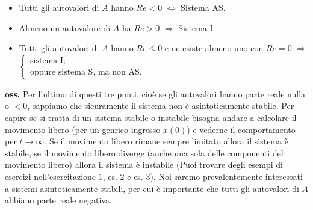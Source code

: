 \begin{itemize}
    \item Tutti gli autovalori di $A$ hanno $Re <0$ $\Longleftrightarrow$ Sistema AS.
    \item Almeno un autovalore di $A$ ha $Re > 0$ $\Longrightarrow$ Sistema I.
    \item Tutti gli autovalori di $A$ hanno $Re \leq 0$ e ne esiste almeno uno con $Re = 0$ $\Longrightarrow$ $\begin{cases}
        \text{sistema I;}\;\\
        \text{oppure sistema S, ma non AS.}\;
    \end{cases}$
\end{itemize}
\textbf{oss.} Per l'ultimo di questi tre punti, cioè se gli autovalori hanno parte reale nulla o $< 0$, sappiamo che sicuramente il sistema non è asintoticamente stabile. Per capire se si tratta di un sistema stabile o instabile bisogna andare a calcolare il movimento libero (per un genrico ingresso $x(0)$) e vederne il comportamento per $t \rightarrow \infty$. Se il movimento libero rimane sempre limitato allora il sistema è stabile, se il movimento libero diverge (anche una sola delle componenti del movimento libero) allora il sistema è instabile (Puoi trovare degli esempi di esercizi nell'esercitazione $1$, es. 2 e es. 3). \newline
\newline
Noi saremo prevalentemente interessati a sistemi asintoticamente stabili, per cui è importante che tutti gli autovalori di $A$ abbiano parte reale negativa.

